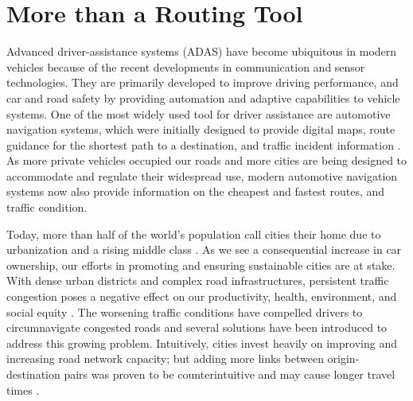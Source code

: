 
\chapter{More than a Routing Tool}

Advanced driver-assistance systems (ADAS) have become ubiquitous in modern vehicles because of the recent developments in communication and sensor technologies. They are primarily developed to improve driving performance, and car and road safety by providing automation and adaptive capabilities to vehicle systems. One of the most widely used tool for driver assistance are automotive navigation systems, which were initially designed to provide digital maps, route guidance for the shortest path to a destination, and traffic incident information \cite{Mikami1978CACS-UrbanControl}. As more private vehicles occupied our roads and more cities are being designed to accommodate and regulate their widespread use, modern automotive navigation systems now also provide information on the cheapest and fastest routes, and traffic condition.

Today, more than half of the world's population call cities their home due to urbanization and a rising middle class \cite{UnitedNations2017}. As we see a consequential increase in car ownership, our efforts in promoting and ensuring sustainable cities are at stake. With dense urban districts and complex road infrastructures, persistent traffic congestion poses a negative effect on our productivity, health, environment, and social equity \cite{Mehndiratta2017}. The worsening traffic conditions have compelled drivers to circumnavigate congested roads and several solutions have been introduced to address this growing problem. Intuitively, cities invest heavily on improving and increasing road network capacity; but adding more links between origin-destination pairs was proven to be counterintuitive and may cause longer travel times \cite{Braess2005,Afimeimounga2005}. 

